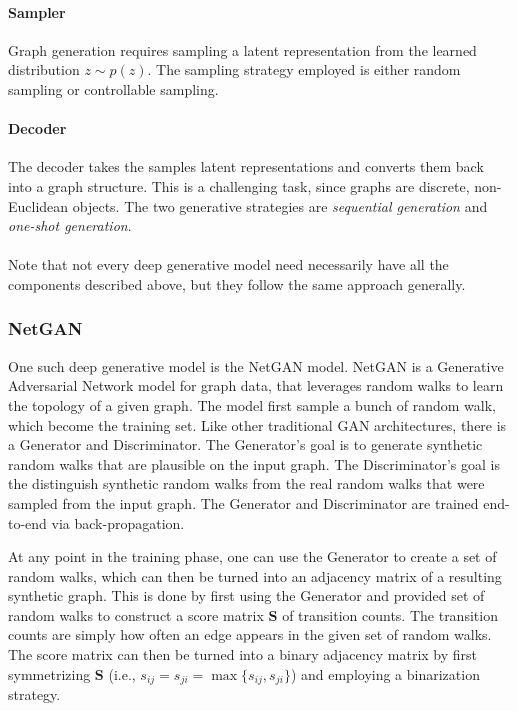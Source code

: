 \documentclass{article}
\begin{document}
\paragraph{Sampler} Graph generation requires sampling a latent representation from the learned distribution $z \sim p(z)$. The sampling strategy employed is either random sampling or controllable sampling. 

\paragraph{Decoder} The decoder takes the samples latent representations and converts them back into a graph structure. This is a challenging task, since graphs are discrete, non-Euclidean objects. The two generative strategies are \emph{sequential generation} and \emph{one-shot generation}.
\\
\\
Note that not every deep generative model need necessarily have all the components described above, but they follow the same approach generally. 

\subsubsection{NetGAN}

One such deep generative model is the NetGAN \cite{bojchevski2018netgan} model. NetGAN is a Generative Adversarial Network model for graph data, that leverages random walks to learn the topology of a given graph. The model first sample a bunch of random walk, which become the training set. Like other traditional GAN architectures, there is a Generator and Discriminator. The Generator's goal is to generate synthetic random walks that are plausible on the input graph. The Discriminator's goal is the distinguish synthetic random walks from the real random walks that were sampled from the input graph. The Generator and Discriminator are trained end-to-end via back-propagation. 

At any point in the training phase, one can use the Generator to create a set of random walks, which can then be turned into an adjacency matrix of a resulting synthetic graph. This is done by first using the Generator and provided set of random walks to construct a score matrix $\mathbf{S}$ of transition counts. The transition counts are simply how often an edge appears in the given set of random walks. The score matrix can then be turned into a binary adjacency matrix by first symmetrizing $\mathbf{S}$ (i.e., $s_{ij}=s_{ji}=\max\{s_{ij},s_{ji}\}$) and employing a binarization strategy. 
\end{document}
